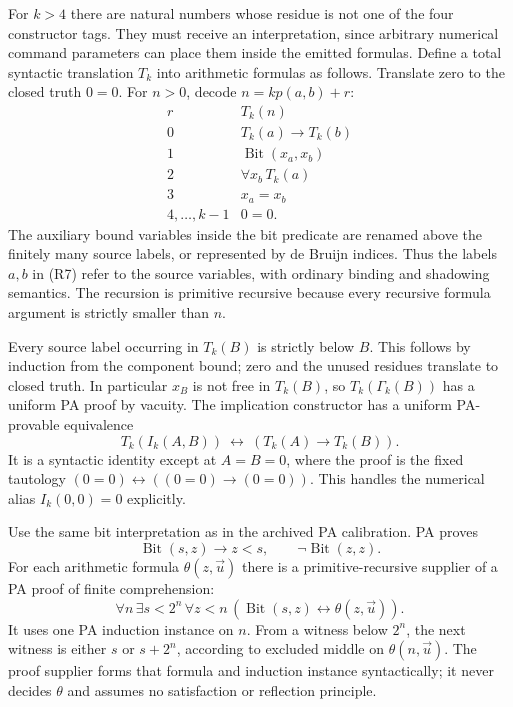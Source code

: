 For $k>4$ there are natural numbers whose residue is not one of the
four constructor tags. They must receive an interpretation, since
arbitrary numerical command parameters can place them inside the
emitted formulas. Define a total syntactic translation $T_k$ into
arithmetic formulas as follows. Translate zero to the closed truth
$0=0$. For $n>0$, decode $n=kp(a,b)+r$:
\[
\begin{array}{c|l}
 r&T_k(n)\\ \hline
 0&T_k(a)\to T_k(b)\\
 1&\operatorname{Bit}(x_a,x_b)\\
 2&\forall x_b\,T_k(a)\\
 3&x_a=x_b\\
 4,\ldots,k-1&0=0.
\end{array}                                             \tag{R7}
\]
The auxiliary bound variables inside the bit predicate are renamed
above the finitely many source labels, or represented by de Bruijn
indices. Thus the labels $a,b$ in (R7) refer to the source variables,
with ordinary binding and shadowing semantics. The recursion is
primitive recursive because every recursive formula argument is
strictly smaller than $n$.

Every source label occurring in $T_k(B)$ is strictly below $B$.
This follows by induction from the component bound; zero and the
unused residues translate to closed truth. In particular $x_B$ is
not free in $T_k(B)$, so $T_k(\Gamma_k(B))$ has a uniform PA proof
by vacuity. The implication constructor has a uniform PA-provable
equivalence
\[
 T_k(I_k(A,B))\ \leftrightarrow\
                    (T_k(A)\to T_k(B)).                 \tag{R8}
\]
It is a syntactic identity except at $A=B=0$, where the proof is the
fixed tautology $(0=0)\leftrightarrow((0=0)\to(0=0))$.
This handles the numerical alias $I_k(0,0)=0$ explicitly.

Use the same bit interpretation as in the archived PA calibration.
PA proves
\[
 \operatorname{Bit}(s,z)\to z<s,
 \qquad\neg\operatorname{Bit}(z,z).
\]
For each arithmetic formula $\theta(z,\vec u)$ there is a
primitive-recursive supplier of a PA proof of finite comprehension:
\[
 \forall n\,\exists s<2^n\,\forall z<n\,
       (\operatorname{Bit}(s,z)\leftrightarrow\theta(z,\vec u)).
                                                               \tag{R9}
\]
It uses one PA induction instance on $n$. From a witness below
$2^n$, the next witness is either $s$ or $s+2^n$, according to
excluded middle on $\theta(n,\vec u)$. The proof supplier forms
that formula and induction instance syntactically; it never decides
$\theta$ and assumes no satisfaction or reflection principle.

